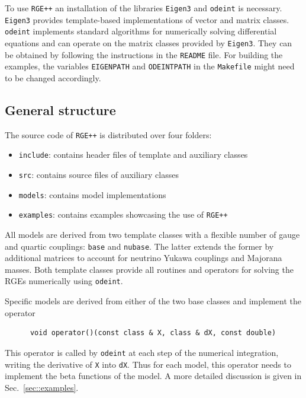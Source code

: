 \documentclass[11pt,a4paper]{article}
\begin{document}
To use \texttt{RGE++} an installation of the libraries \texttt{Eigen3} \cite{eigenweb} and \texttt{odeint} \cite{Ahnert:2011} is necessary.
\texttt{Eigen3} provides template-based implementations of vector and matrix classes. \texttt{odeint} implements standard algorithms for numerically solving differential equations
and can operate on the matrix classes provided by \texttt{Eigen3}.
They can be obtained by following the instructions in the \texttt{README} file. For building the examples, the variables \texttt{EIGENPATH} and \texttt{ODEINTPATH} in the \texttt{Makefile} might need to be changed accordingly.

\subsection{\label{sec::operation} General structure}
The source code of \texttt{RGE++} is distributed over four folders:
\begin{itemize}
\item \texttt{include}: contains header files of template and auxiliary classes
\item \texttt{src}: contains source files of auxiliary classes
\item \texttt{models}: contains model implementations
\item \texttt{examples}: contains examples showcasing the use of \texttt{RGE++}
\end{itemize}
All models are derived from two template classes with a flexible number of gauge and quartic couplings: \texttt{base} and \texttt{nubase}. The latter extends the former by additional matrices to account for neutrino Yukawa couplings
and Majorana masses. Both template classes provide all routines and operators for solving the RGEs numerically using \texttt{odeint}.

Specific models are derived from either of the two base classes and implement the operator
\begin{lstlisting}
      void operator()(const class & X, class & dX, const double)
\end{lstlisting}
This operator is called by \texttt{odeint} at each step of the numerical integration, writing the derivative of \texttt{X} into \texttt{dX}.
Thus for each model, this operator needs to implement the beta functions of the model. A more detailed discussion is given in Sec.~\ref{sec::examples}.
\end{document}
